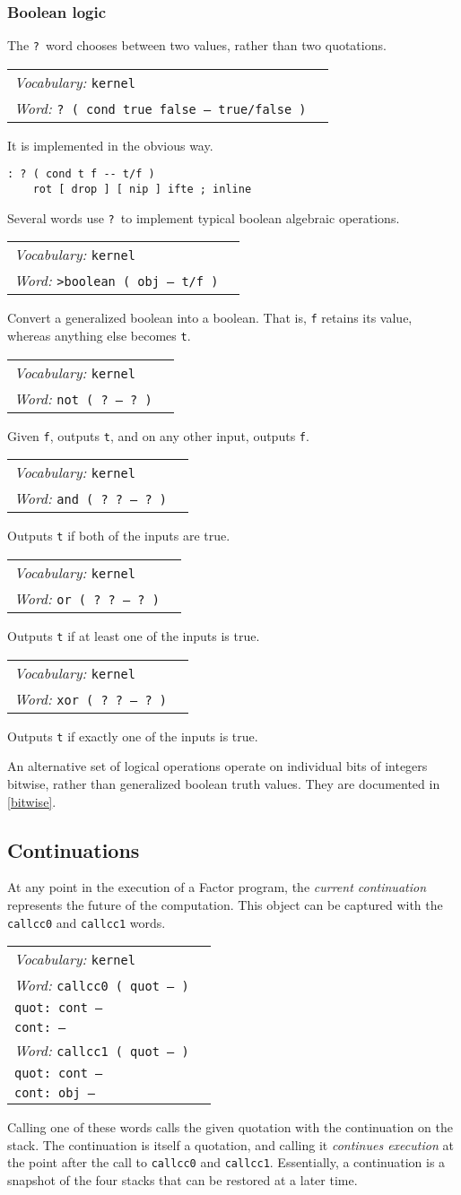 \documentclass{book}
\newcommand{\vocabulary}[1]{\emph{Vocabulary:} \texttt{#1}&\\}
\newcommand{\ordinaryword}[2]{\index{\texttt{#1}}\emph{Word:} \texttt{#2}&\\}
\newcommand{\wordtable}[1]{


\begin{tabularx}{12cm}{lX}
\hline
#1
\hline
\end{tabularx}

}
\begin{document}
\subsubsection{Boolean logic}

The \texttt{?}~word chooses between two values, rather than two quotations.
\wordtable{
\vocabulary{kernel}
\ordinaryword{?}{?~( cond true false -- true/false )}
}
It is implemented in the obvious way.
\begin{verbatim}
: ? ( cond t f -- t/f )
    rot [ drop ] [ nip ] ifte ; inline
\end{verbatim}
Several words use \texttt{?}~to implement typical boolean algebraic operations.
\wordtable{
\vocabulary{kernel}
\ordinaryword{>boolean}{>boolean ( obj -- t/f )}
}
Convert a generalized boolean into a boolean. That is, \texttt{f} retains its value, whereas anything else becomes \texttt{t}.
\wordtable{
\vocabulary{kernel}
\ordinaryword{not}{not ( ?~-- ?~)}
}
Given \texttt{f}, outputs \texttt{t}, and on any other input, outputs \texttt{f}.
\wordtable{
\vocabulary{kernel}
\ordinaryword{and}{and ( ?~?~-- ?~)}
}
Outputs \texttt{t} if both of the inputs are true.
\wordtable{
\vocabulary{kernel}
\ordinaryword{or}{or ( ?~?~-- ?~)}
}
Outputs \texttt{t} if at least one of the inputs is true.
\wordtable{
\vocabulary{kernel}
\ordinaryword{xor}{xor ( ?~?~-- ?~)}
}
Outputs \texttt{t} if exactly one of the inputs is true.

An alternative set of logical operations operate on individual bits of integers bitwise, rather than generalized boolean truth values. They are documented in \ref{bitwise}.

\subsection{Continuations}

\newcommand{\contglos}{
}
\contglos
At any point in the execution of a Factor program, the \emph{current continuation} represents the future of the computation. This object can be captured with the \texttt{callcc0} and \texttt{callcc1} words.
\wordtable{
\vocabulary{kernel}
\ordinaryword{callcc0}{callcc0 ( quot -- )}
\texttt{quot:~cont --}\\
\texttt{cont:~--}\\
\ordinaryword{callcc1}{callcc1 ( quot -- )}
\texttt{quot:~cont --}\\
\texttt{cont:~obj --}\\
}
Calling one of these words calls the given quotation with the continuation on the stack. The continuation is itself a quotation, and calling it \emph{continues execution} at the point after the call to \texttt{callcc0} and \texttt{callcc1}. Essentially, a continuation is a snapshot of the four stacks that can be restored at a later time.
\end{document}
